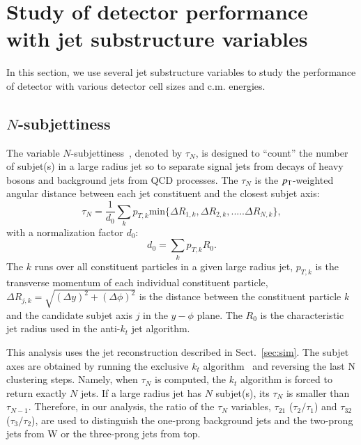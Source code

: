 \section{Study of detector performance with jet substructure variables}
In this section, we use several jet substructure variables to study the performance of detector with various detector cell sizes and c.m. energies.

\subsection{$N$-subjettiness \label{sec:nsub}}
The variable $N$-subjettiness~\cite{Thaler:2010tr}, denoted by $\tau_N$, is designed to 
``count'' the number of subjet(s) in a large radius jet so to separate 
signal jets from decays of heavy bosons and background jets from QCD processes. 
The $\tau_N$ is the $p_{\mathrm{T}}$-weighted angular distance between each jet 
constituent and the closest subjet axis: 
\begin{equation}\label{eq:Nsub_1}
\tau_{N}=\frac{1}{d_{0}}\sum_{k}p_{T,k} \mathrm{min}\{\Delta R_{1,k},\Delta R_{2,k},.....\Delta R_{N,k}\},
\end{equation}
with a normalization factor $d_0$: \[d_{0}=\sum_{k}p_{T,k} R_{0}.\] 
The $k$ runs over all constituent particles in a given large radius jet, 
$p_{T,k}$ is the transverse momentum of each individual constituent particle, 
$\Delta R_{j,k}=\sqrt{(\Delta y)^{2}+(\Delta \phi)^{2}}$ is the distance 
between the constituent particle $k$ and the candidate subjet axis $j$ in the 
$y-\phi$ plane. The $R_{0}$ is the characteristic jet radius used in 
the anti-$k_t$ jet algorithm. 

This analysis uses the jet reconstruction described in Sect.~\ref{sec:sim}. 
The subjet axes are obtained by running the 
exclusive $k_{t}$ algorithm~\cite{Catani:246812} and reversing the last N clustering steps. 
Namely, when $\tau_N$ is computed, the $k_{t}$ algorithm is forced to return 
exactly $N$ jets. If a large radius jet has $N$ subjet(s), its $\tau_{N}$ is 
smaller than $\tau_{N-1}$. Therefore, in our analysis, 
the ratio of the $\tau_{N}$ variables, 
$\tau_{21}$ ($\tau_{2}/\tau_{1}$) and $\tau_{32}$ ($\tau_{3}/\tau_{2}$),  
are used to distinguish the one-prong background jets and 
the two-prong jets from W or the three-prong jets from top. 

